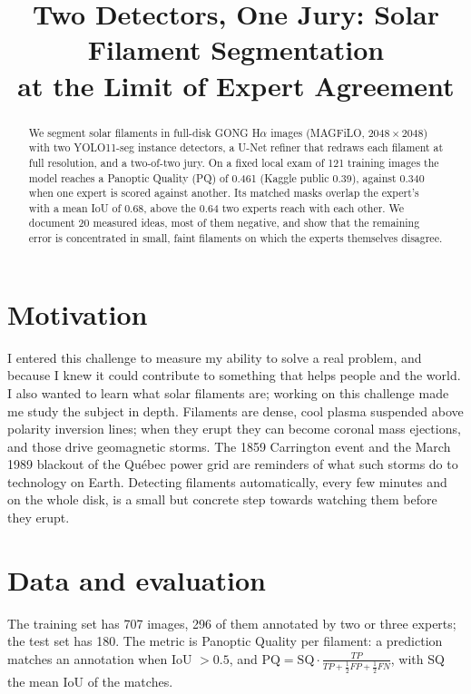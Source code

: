 \documentclass[conference]{IEEEtran}
\begin{document}
\title{Two Detectors, One Jury: Solar Filament Segmentation\\at the Limit of Expert Agreement}

\author{
}

\maketitle

\begin{abstract}
We segment solar filaments in full-disk GONG H$\alpha$ images (MAGFiLO, $2048\times2048$) with two YOLO11-seg
instance detectors, a U-Net refiner that redraws each filament at full resolution, and a two-of-two jury.
On a fixed local exam of 121 training images the model reaches a Panoptic Quality (PQ) of 0.461
(Kaggle public 0.39), against 0.340 when one expert is scored against another. Its matched masks overlap the
expert's with a mean IoU of 0.68, above the 0.64 two experts reach with each other. We document 20 measured
ideas, most of them negative, and show that the remaining error is concentrated in small, faint filaments
on which the experts themselves disagree.
\end{abstract}

\section{Motivation}
I entered this challenge to measure my ability to solve a real problem, and because I knew it could
contribute to something that helps people and the world. I also wanted to learn what solar filaments are;
working on this challenge made me study the subject in depth.
Filaments are dense, cool plasma suspended above polarity inversion lines; when they erupt they can become
coronal mass ejections, and those drive geomagnetic storms. The 1859 Carrington event and the March 1989
blackout of the Qu\'ebec power grid are reminders of what such storms do to technology on Earth. Detecting
filaments automatically, every few minutes and on the whole disk, is a small but concrete step towards
watching them before they erupt.

\section{Data and evaluation}
The training set has 707 images, 296 of them annotated by two or three experts; the test set has 180. The
metric is Panoptic Quality per filament: a prediction matches an annotation when IoU $>0.5$, and
$\mathrm{PQ} = \mathrm{SQ}\cdot\frac{TP}{TP+\frac12 FP+\frac12 FN}$, with SQ the mean IoU of the matches.
\end{document}
